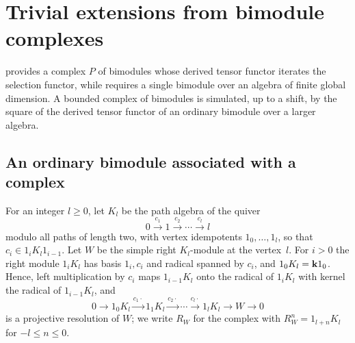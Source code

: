 \section{Trivial extensions from bimodule complexes}
\label{sec:simulation}

 provides a complex $P$ of bimodules whose derived tensor
functor iterates the selection functor, while  requires
a single bimodule over an algebra of finite global dimension. A bounded complex
of bimodules is simulated, up to a shift, by the square of the derived tensor
functor of an ordinary bimodule over a larger algebra.

\subsection{An ordinary bimodule associated with a complex}
\label{subsec:simulation}

For an integer ${l\geq0}$, let $K_l$ be the path algebra of the quiver
\[
  0\xrightarrow{c_1}1\xrightarrow{c_2}\cdots\xrightarrow{c_l}l
\]
modulo all paths of length two, with vertex idempotents $1_0,\dots,1_l$, so that
${c_i\in1_iK_l1_{i-1}}$. Let $W$ be the simple right $K_l$-module at the
vertex~$l$. For ${i>0}$ the right module $1_iK_l$ has basis $1_i,c_i$ and radical
spanned by $c_i$, and ${1_0K_l=\mathbf{k}1_0}$. Hence, left multiplication by $c_i$ maps
$1_{i-1}K_l$ onto the radical of $1_iK_l$ with kernel the radical of
$1_{i-1}K_l$, and
\begin{equation}
  \label{eq:chain-resolution}
  0\longrightarrow1_0K_l\xrightarrow{c_1\cdot}1_1K_l\xrightarrow{c_2\cdot}
  \cdots\xrightarrow{c_l\cdot}1_lK_l\longrightarrow W\longrightarrow0
\end{equation}
is a projective resolution of $W$; we write $R_W$ for the complex with
${R_W^n=1_{l+n}K_l}$ for ${-l\leq n\leq0}$.

